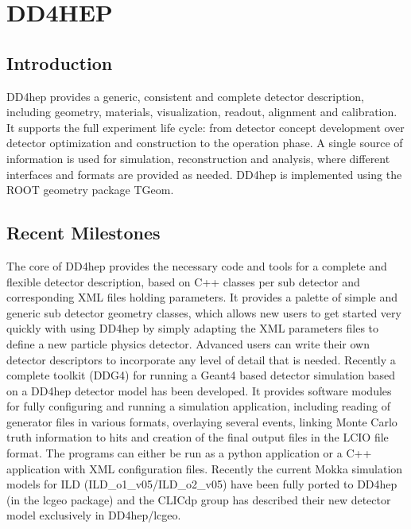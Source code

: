 \section{DD4HEP}

\subsection{Introduction}
DD4hep\cite{dd4hepWebsite,1742-6596-513-2-022010} provides a generic, consistent and complete detector description, including geometry, materials, visualization, readout, alignment and calibration. It supports the full experiment life cycle: from detector concept development over detector optimization and construction to the operation phase. A single source of information is used for simulation, reconstruction and analysis, where different interfaces and formats are provided as needed. DD4hep is implemented using the ROOT geometry package TGeom.

\subsection{Recent Milestones}
The core of DD4hep provides the necessary code and tools for a complete and flexible detector description, based on C++ classes per sub detector and corresponding XML files holding parameters. It provides a palette of simple and generic sub detector geometry classes, which allows new users to get started very quickly with using DD4hep by simply adapting the XML parameters files to define a new particle physics detector. Advanced users can write their own detector descriptors to incorporate any level of detail that is needed. Recently a complete toolkit (DDG4)\cite{DDG4:CHEP2015} for running a Geant4 based detector simulation based on a DD4hep detector model has been developed. It provides software modules for fully configuring and running a simulation application, including reading of generator files in various formats, overlaying several events, linking Monte Carlo truth information to hits and creation of the final output files in the LCIO file format. The programs can either be run as a python application or a C++ application with XML configuration files. Recently the current Mokka simulation models for ILD (ILD\_o1\_v05/ILD\_o2\_v05) have been fully ported to DD4hep (in the lcgeo package) and the CLICdp group has described their new detector model exclusively in DD4hep/lcgeo.

